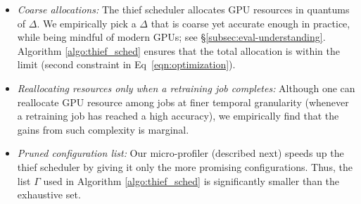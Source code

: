 \begin{itemize}
\item {\em Coarse allocations:}
The thief scheduler allocates GPU resources in quantums of $\Delta$.  
We empirically pick a $\Delta$ that is coarse yet accurate enough in practice, while being mindful of modern GPUs\cite{nvidia-mps}; see \S\ref{subsec:eval-understanding}. %
Algorithm \ref{algo:thief_sched} ensures that the total allocation is within the limit (second constraint in Eq~\ref{eqn:optimization}). %


\item {\em Reallocating resources only when a retraining job completes:}
Although one can reallocate GPU resource among jobs at finer temporal granularity (\eg whenever a retraining job has reached a high accuracy), we empirically find that the gains from such complexity is marginal. %

\item{\em Pruned configuration list:} 
Our micro-profiler (described next) speeds up the thief scheduler by giving it only the more promising configurations. Thus, the list $\Gamma$ used in Algorithm \ref{algo:thief_sched} is significantly smaller than the exhaustive set.  
\end{itemize}

